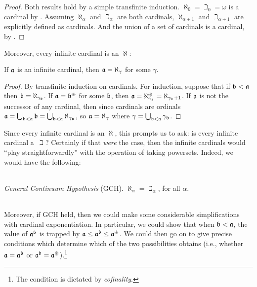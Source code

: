 \documentclass[../../../include/open-logic-section]{subfiles}
\begin{document}
\begin{proof}
Both results hold by a simple transfinite induction. $\aleph_0 =
\beth_0 = \omega$ is a cardinal by
. Assuming $\aleph_\alpha$ and
$\beth_\alpha$ are both cardinals, $\aleph_{\alpha+1}$ and
$\beth_{\alpha+1}$ are explicitly defined as cardinals. And the union
of a set of cardinals is a cardinal, by
.
\end{proof}

Moreover, every infinite cardinal is an $\aleph$:

\begin{prop}
If $\mathfrak{a}$ is an infinite cardinal, then $\mathfrak{a} =
\aleph_\gamma$ for some $\gamma$.
\end{prop}

\begin{proof}
By transfinite induction on cardinals. For induction, suppose that if
$\mathfrak{b} < \mathfrak{a}$ then $\mathfrak{b} =
\aleph_{\gamma_{\mathfrak{b}}}$. If $\mathfrak{a} =
\mathfrak{b}^{\oplus}$ for some $\mathfrak{b}$, then $\mathfrak{a} =
\aleph_{\gamma_{\mathfrak{b}}}^{\oplus}=
\aleph_{\gamma_{\mathfrak{b}}+1}$. If $\mathfrak{a}$ is not the
successor of any cardinal, then since cardinals are ordinals
$\mathfrak{a} = \bigcup_{\mathfrak{b} < \mathfrak{a}} \mathfrak{b} =
\bigcup_{\mathfrak{b} < \mathfrak{a}}{\aleph_{\gamma_{\mathfrak{b}}}}$,
so $\mathfrak{a} = \aleph_\gamma$ where $\gamma =
\bigcup_{\mathfrak{b} < \mathfrak{a}}\gamma_{\mathfrak{b}}$. 
\end{proof}

Since every infinite cardinal is an $\aleph$, this prompts us to ask:
is every infinite cardinal a~$\beth$? Certainly if that \emph{were}
the case, then the infinite cardinals would ``play straightforwardly''
with the operation of taking powersets. Indeed, we would have the
following:

\
\\\emph{General Continuum Hypothesis} (GCH). $\aleph_\alpha  = \beth_\alpha$, for all $\alpha$. 

\
\\Moreover, if GCH held, then we could make some considerable
simplifications with cardinal exponentiation. In particular, we could
show that when $\mathfrak{b} < \mathfrak{a}$, the value of
$\mathfrak{a}^{\mathfrak{b}}$ is trapped by
$\mathfrak{a}\leq \mathfrak{a}^{\mathfrak{b}} \leq
\mathfrak{a}^{\oplus}$. We could then go on to give precise
conditions which determine which of the two possibilities obtains
(i.e., whether $\mathfrak{a} = \mathfrak{a}^{\mathfrak{b}}$
or $\mathfrak{a}^{\mathfrak{b}} =
\mathfrak{a}^{\oplus}$).\footnote{The condition is dictated by
\emph{cofinality}.}
\end{document}
